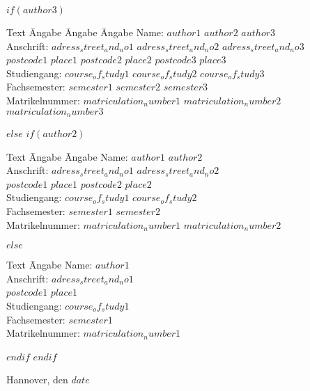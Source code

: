 \documentclass[
$if(fontsize)$
  $fontsize$,
$endif$
$if(lang)$
  $babel-lang$,
$endif$
$if(papersize)$
  $papersize$paper,
$endif$
$for(classoption)$
  $classoption$$sep$,
$endfor$
]{$documentclass$}
\begin{document}
\begin{titlepage}
{\begin{center}
$if(author3)$
\parbox{0cm} {\begin{tabbing}
		Text \hspace{20mm} \= Angabe \hspace{30mm} \= Angabe \hspace{30mm} \= Angabe \kill
		Name:\> $author1$ \> $author2$  \> $author3$ \\
		Anschrift:\> $adress_street_and_no1$ \> $adress_street_and_no2$ \> $adress_street_and_no3$\\
		\>$postcode1$ $place1$ \> $postcode2$ $place2$ \> $postcode3$ $place3$\\
		Studiengang: \>  $course_of_study1$ \> $course_of_study2$ \> $course_of_study3$ \\
		Fachsemester:\> $semester1$ \> $semester2$ \> $semester3$\\
		Matrikelnummer:\> $matriculation_number1$ \>  $matriculation_number2$ \>  $matriculation_number3$\\
\end{tabbing}}
$else$
	$if(author2)$
	\parbox{0cm} {\begin{tabbing}
			Text \hspace{40mm} \= Angabe \hspace{40mm} \= Angabe \kill
			Name:\> $author1$ \> $author2$ \\
			Anschrift:\> $adress_street_and_no1$ \> $adress_street_and_no2$\\
			\>$postcode1$ $place1$ \> $postcode2$ $place2$\\
			Studiengang: \>   $course_of_study1$ \>  $course_of_study2$\\
			Fachsemester:\> $semester1$ \> $semester2$\\
			Matrikelnummer:\> $matriculation_number1$ \>  $matriculation_number2$\\
	\end{tabbing}}
	$else$
	\parbox{0cm} {\begin{tabbing}
			Text \hspace{40mm} \= Angabe \hspace{40mm} \kill
			Name:\> $author1$ \\
			Anschrift:\> $adress_street_and_no1$ \\
			\>$postcode1$ $place1$ \\
			Studiengang: \>  $course_of_study1$ \\
			Fachsemester:\> $semester1$ \\
			Matrikelnummer:\> $matriculation_number1$ \\
	\end{tabbing}}
	$endif$
$endif$
\end{center}
}
\vfill
Hannover, den $date$ %


\restoregeometry





\end{titlepage}
\end{document}
